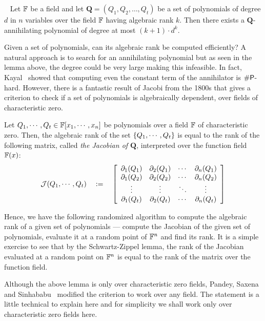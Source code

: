 \begin{lemma}~\label{lem:degree upper bound for annihilating poly}
Let $\F$ be a field and let $\mathbf{Q} = (Q_1, Q_2, \ldots, Q_t)$ be a set of polynomials of degree $d$ in $n$ variables over the field $\F$ having algebraic rank $k$. Then there exists a $\mathbf{Q}$-annihilating polynomial
of degree at most $(k+1)\cdot d^k$.
\end{lemma}  

Given a set of polynomials, can its algebraic rank be computed efficiently? A natural approach is to search for an annihilating polynomial but as seen in the lemma above, the degree could be very large making this infeasible. In fact, Kayal~\cite{Kayal09} showed that computing even the constant term of the annihilator is $\#\P$-hard. However, there is a fantastic result of Jacobi from the 1800s that gives a criterion to check if a set of polynomials is algebraically dependent, over fields of characteristic zero. 

\begin{lemma}\label{lem:jacobian-criterion}
Let $Q_1,\cdots, Q_t \in \F[x_1,\cdots, x_n]$ be polynomials over a field $\F$ of characteristic zero. Then, the algebraic rank of the set $\set{Q_1,\cdots, Q_t}$ is equal to the rank of the following matrix, called \emph{the Jacobian of $\mathbf{Q}$}, interpreted over the function field $\F(x)$:
\[
\mathcal{J}(Q_1,\cdots, Q_t) \spaced{:=} \insquare{\begin{array}{cccc}
\partial_1(Q_1) & \partial_2(Q_1) & \cdots & \partial_n(Q_1)\\
\partial_1(Q_2) & \partial_2(Q_2) & \cdots & \partial_n(Q_2)\\
\vdots & \vdots & \ddots & \vdots\\
\partial_1(Q_t) & \partial_2(Q_t) & \cdots & \partial_n(Q_t)
                                          \end{array}}                                          
\]
\end{lemma}

Hence, we have the following randomized algorithm to compute the algebraic rank of a given set of polynomials --- compute the Jacobian of the given set of polynomials, evaluate it at a random point of $\F^n$ and find its rank.
It is a simple exercise to see that by the Schwartz-Zippel lemma, the rank of the Jacobian evaluated at a random point on $\F^n$ is equal to the rank of the matrix over the function field.

Although the above lemma is only over characteristic zero fields, Pandey, Saxena and Sinhababu~\cite{PSS16} modified the criterion to work over any field. The statement is a little technical to explain here and for simplicity we shall work only over characteristic zero fields here. 
\\


